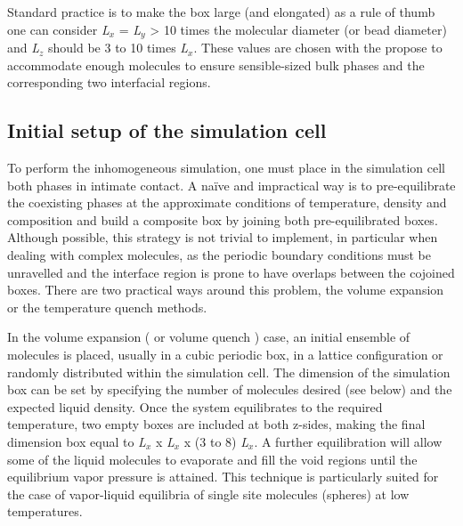 \documentclass[9pt,bestpractices]{livecoms}
\begin{document}
Standard practice is to make the box large (and elongated)
 as a rule of thumb one can consider
\textit{L}$_{x}$ = \textit{L}$_{y}$ {\textgreater} 10 times the molecular
diameter (or bead diameter) and \textit{L}$_{z}$ should be 3 to 10 times
\textit{L}$_{x}$. These values are chosen with the propose to accommodate
enough molecules to ensure sensible-sized bulk phases and the corresponding two
interfacial regions. 

\subsection{Initial setup of the simulation cell}

To perform the inhomogeneous simulation, one must place in the simulation cell
both phases in intimate contact. A na\"{i}ve and impractical way is to
pre-equilibrate the coexisting phases at the approximate conditions of
temperature, density and composition and build a composite box by joining both
pre-equilibrated boxes. Although possible, this strategy is not trivial to
implement, in particular when dealing with complex molecules, as the periodic
boundary conditions must be unravelled and the interface region is prone to
have overlaps between the cojoined boxes. There are two practical ways around
this problem, the volume expansion or the temperature quench methods. 

In the volume expansion ( or volume quench \citep{holcomb1993} ) case,
an initial ensemble of molecules is placed,  usually in a cubic periodic box,
in a lattice configuration or randomly distributed within the simulation cell.
The dimension of the simulation box can be set by specifying the number of
molecules desired (see below) and the expected liquid density. Once the system
equilibrates to the required temperature, two empty boxes are included at both
z-sides, making the final dimension box equal to \textit{L}$_{x}$
x \textit{L}$_{x}$ x (3 to 8) \textit{L}$_{x}$.  A further equilibration will
allow some of the liquid molecules to evaporate and fill the void regions until
the equilibrium vapor pressure is attained. This technique is particularly
suited for the case of vapor-liquid equilibria of single site molecules
(spheres) at low temperatures. 
\end{document}
